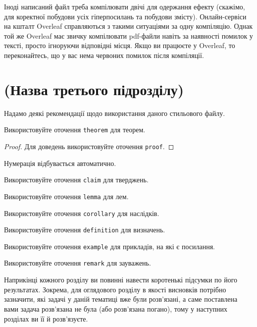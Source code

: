 Іноді написаний файл треба компілювати двічі для одержання ефекту 
(скажімо, для коректної побудови усіх гіперпосилань та побудови змісту).  
Онлайн-сервіси на кшталт Overleaf справляються з такими ситуаціями за одну компіляцію. Однак той 
же Overleaf має звичку компілювати pdf-файли навіть за наявності помилок у 
тексті, просто ігноруючи відповідні місця. Якщо ви працюєте у Overleaf, 
то переконайтесь, що у вас нема червоних помилок після компіляції.

\section{(Назва третього підрозділу)}

Надамо деякі рекомендації щодо використання даного стильового файлу.

\begin{theorem}
	Використовуйте оточення \texttt{theorem} для теорем.
\end{theorem}
\begin{proof}
	Для доведень використовуйте оточення \texttt{proof}.
\end{proof}
\begin{theorem}
	Нумерація відбувається автоматично.
\end{theorem}
\begin{claim}
	Використовуйте оточення \texttt{claim} для тверджень.
\end{claim}
\begin{lemma}
	Використовуйте оточення \texttt{lemma} для лем.
\end{lemma}
\begin{corollary}
	Використовуйте оточення \texttt{corollary} для наслідків.
\end{corollary}
\begin{definition}
	Використовуйте оточення \texttt{definition} для визначень.
\end{definition}
\begin{example}
	Використовуйте оточення \texttt{example} для прикладів, на які є посилання.
\end{example}
\begin{remark}
	Використовуйте оточення \texttt{remark} для зауважень.
\end{remark}


\chapconclude

Наприкінці кожного розділу ви повинні навести коротенькі підсумки по його 
результатах. Зокрема, для оглядового розділу в якості висновків потрібно 
зазначити, які задачі у даній тематиці вже були розв'язані, а саме 
поставлена вами задача розв'язана не була (або розв'язана погано), тому у 
наступних розділах ви її й розв'язуєте.